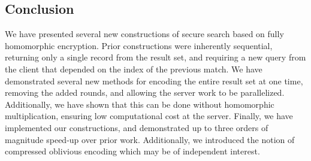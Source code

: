 \subsection{Conclusion}
We have presented several new constructions of secure search based on fully homomorphic encryption.  Prior constructions were
inherently sequential, returning only a single record from the result set, and requiring a new query from the client that depended on the index of the previous match.  We have demonstrated several new methods for 
encoding the entire result set at one time, 
removing the added rounds, and allowing the
server work to be parallelized.  
Additionally, we have shown that this can be done without homomorphic multiplication, 
ensuring low computational cost at the server. Finally, we have implemented our constructions, and demonstrated up to three orders of magnitude speed-up over prior work.  Additionally, we introduced the notion of compressed oblivious encoding which may be of independent interest.
